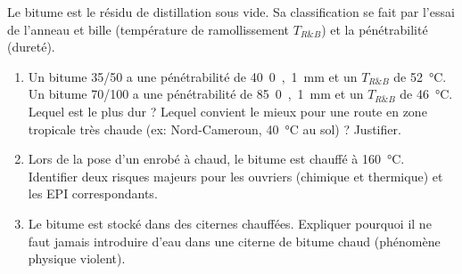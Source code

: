 \documentclass[11pt]{article}
\begin{document}
\begin{exercice}
Le bitume est le résidu de distillation sous vide. Sa classification se fait par l'essai de l'anneau et bille (température de ramollissement $T_{R\&B}$) et la pénétrabilité (dureté).
\begin{enumerate}
    \item Un bitume 35/50 a une pénétrabilité de \SI{40}{0,1 mm} et un $T_{R\&B}$ de \SI{52}{\celsius}. Un bitume 70/100 a une pénétrabilité de \SI{85}{0,1 mm} et un $T_{R\&B}$ de \SI{46}{\celsius}. Lequel est le plus dur ? Lequel convient le mieux pour une route en zone tropicale très chaude (ex: Nord-Cameroun, \SI{40}{\celsius} au sol) ? Justifier.
    \item Lors de la pose d'un enrobé à chaud, le bitume est chauffé à \SI{160}{\celsius}. Identifier deux risques majeurs pour les ouvriers (chimique et thermique) et les EPI correspondants.
    \item Le bitume est stocké dans des citernes chauffées. Expliquer pourquoi il ne faut jamais introduire d'eau dans une citerne de bitume chaud (phénomène physique violent).
\end{enumerate}
\end{exercice}
\end{document}
